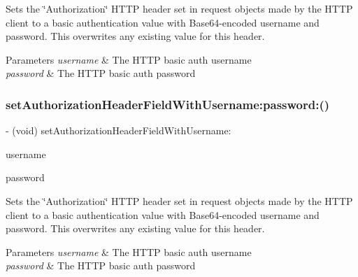 Sets the \char`\"{}\+Authorization\char`\"{} H\+T\+TP header set in request objects made by the H\+T\+TP client to a basic authentication value with Base64-\/encoded username and password. This overwrites any existing value for this header.


\begin{DoxyParams}{Parameters}
{\em username} & The H\+T\+TP basic auth username \\
\hline
{\em password} & The H\+T\+TP basic auth password \\
\hline
\end{DoxyParams}
\mbox{\label{interface_a_f_h_t_t_p_request_serializer_a67c09b048eff53d3e9cad39a954d5676}} 
\subsubsection{\texorpdfstring{set\+Authorization\+Header\+Field\+With\+Username\+:password\+:()}{setAuthorizationHeaderFieldWithUsername:password:()}\hspace{0.1cm}{\footnotesize\ttfamily [3/3]}}
{\footnotesize\ttfamily -\/ (void) set\+Authorization\+Header\+Field\+With\+Username\+: \begin{DoxyParamCaption}\item[{(N\+S\+String $\ast$)}]{username }\item[{password:(N\+S\+String $\ast$)}]{password }\end{DoxyParamCaption}}

Sets the \char`\"{}\+Authorization\char`\"{} H\+T\+TP header set in request objects made by the H\+T\+TP client to a basic authentication value with Base64-\/encoded username and password. This overwrites any existing value for this header.


\begin{DoxyParams}{Parameters}
{\em username} & The H\+T\+TP basic auth username \\
\hline
{\em password} & The H\+T\+TP basic auth password \\
\hline
\end{DoxyParams}
\mbox{\label{interface_a_f_h_t_t_p_request_serializer_a3b30fd73d2913d6c86ac338f79a88c68}} 
